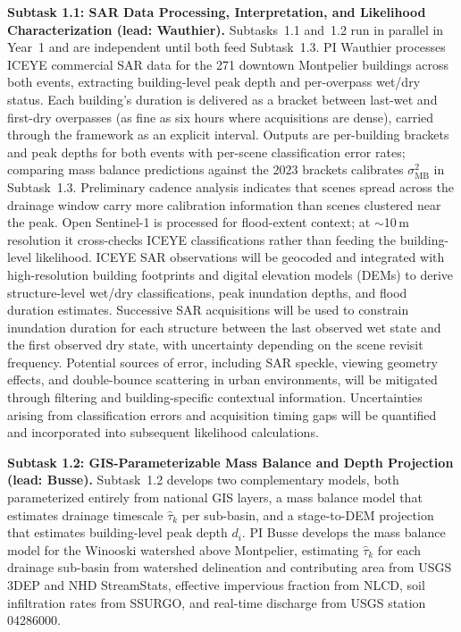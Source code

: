 \documentclass[11pt]{article}
\begin{document}
\textbf{Subtask 1.1: SAR Data Processing, Interpretation, and Likelihood Characterization
(lead: Wauthier).}
Subtasks~1.1 and~1.2 run in parallel in Year~1 and are independent until both feed Subtask~1.3.
PI Wauthier processes ICEYE commercial SAR data for the 271 downtown Montpelier buildings across both events, extracting building-level peak depth and per-overpass wet/dry status.
Each building's duration is delivered as a bracket between last-wet and first-dry overpasses (as fine as six hours where acquisitions are dense), carried through the framework as an explicit interval.
Outputs are per-building brackets and peak depths for both events with per-scene classification error rates; comparing mass balance predictions against the 2023 brackets calibrates $\sigma_{\mathrm{MB}}^2$ in Subtask~1.3. Preliminary cadence analysis indicates that scenes spread across the drainage window carry more calibration information than scenes clustered near the peak.
Open Sentinel-1 is processed for flood-extent context; at ${\sim}$10\,m resolution it cross-checks ICEYE classifications rather than feeding the building-level likelihood.
ICEYE SAR observations will be geocoded and integrated with high-resolution building footprints and digital elevation models (DEMs) to derive structure-level wet/dry classifications, peak inundation depths, and flood duration estimates. Successive SAR acquisitions will be used to constrain inundation duration for each structure between the last observed wet state and the first observed dry state, with uncertainty depending on the scene revisit frequency. Potential sources of error, including SAR speckle, viewing geometry effects, and double-bounce scattering in urban environments, will be mitigated through filtering and building-specific contextual information. Uncertainties arising from classification errors and acquisition timing gaps will be quantified and incorporated into subsequent likelihood calculations.

\textbf{Subtask 1.2: GIS-Parameterizable Mass Balance and Depth Projection (lead: Busse).}
Subtask~1.2 develops two complementary models, both parameterized entirely from
national GIS layers, a mass balance model that estimates drainage timescale
$\hat{\tau}_k$ per sub-basin, and a stage-to-DEM projection that estimates
building-level peak depth $d_i$.
PI Busse develops the mass balance model for the Winooski watershed above
Montpelier, estimating $\hat{\tau}_k$ for each drainage sub-basin from watershed delineation and contributing area from USGS 3DEP and NHD StreamStats, effective impervious fraction from NLCD, soil infiltration rates from SSURGO, and real-time discharge from USGS station 04286000.
\end{document}

